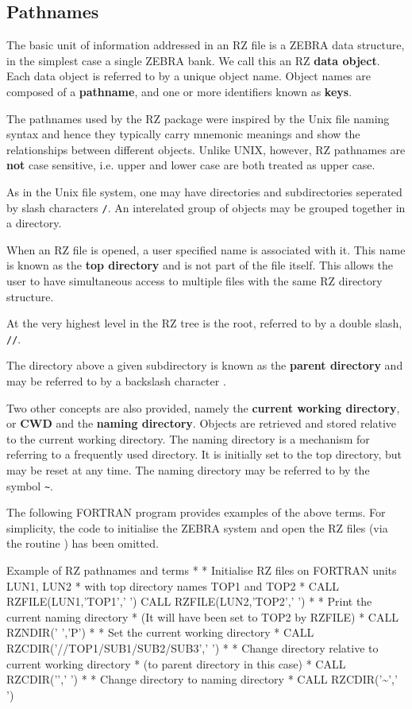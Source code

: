 \subsection{Pathnames}
\par 
The basic unit of information addressed in an RZ file
is a ZEBRA data structure, in the simplest case a single ZEBRA bank.
We call this an RZ
{\bf data object}.
Each data object is referred to by a unique object name.
Object names are composed of a
{\bf pathname}, and one or more identifiers known as {\bf keys}.
\par
{}
The pathnames used by the RZ package were inspired by
the Unix file naming syntax and hence they typically 
carry mnemonic meanings and show the relationships
between different objects.
Unlike UNIX, however, RZ pathnames are {\bf not} case sensitive, i.e.
upper and lower case are both treated as upper case.
\par 
As in the Unix file system, one may have directories and subdirectories
seperated by slash characters {\tt /}.
An interelated group of objects may be grouped together in a directory.
\par
When an RZ file is opened, a user specified name is associated with it.
This name is known as the {\bf top directory} and is not
part of the file itself. This allows the user to have simultaneous
access to multiple files with the same RZ directory structure.
\par
At the very highest level in the RZ tree is the root, referred
to by a double slash, {\tt //}.
\par
The directory above a given subdirectory is known as the
{\bf parent directory} and may be referred to by a backslash
character \bs .
\par
Two other concepts are also provided, namely the {\bf current working directory},
or {\bf CWD} and the {\bf naming directory}. Objects are retrieved
and stored relative to the current working directory. The naming directory
is a mechanism for referring to a frequently used directory. 
It is initially set to the top directory, but may be reset at any time.
The naming directory may be referred to by the symbol {\tt\~{}}.
\par
The following FORTRAN program provides examples of the above
terms. For simplicity, the code to initialise the ZEBRA system
and open the RZ files (via the routine ) has
been omitted.
\begin{XMPt}{Example of RZ pathnames and terms}
*
*     Initialise RZ files on FORTRAN units LUN1, LUN2
*     with top directory names TOP1 and TOP2
*
      CALL RZFILE(LUN1,'TOP1',' ')
      CALL RZFILE(LUN2,'TOP2',' ')
*
*     Print the current naming directory
*     (It will have been set to TOP2 by RZFILE)
*
      CALL RZNDIR(' ','P')
*
*     Set the current working directory
*
      CALL RZCDIR('//TOP1/SUB1/SUB2/SUB3',' ')
*
*     Change directory relative to current working directory
*     (to parent directory in this case)
*
      CALL RZCDIR('\bs ',' ')
*
*     Change directory to naming directory
*
      CALL RZCDIR('\~{}',' ')
\end{XMPt}
